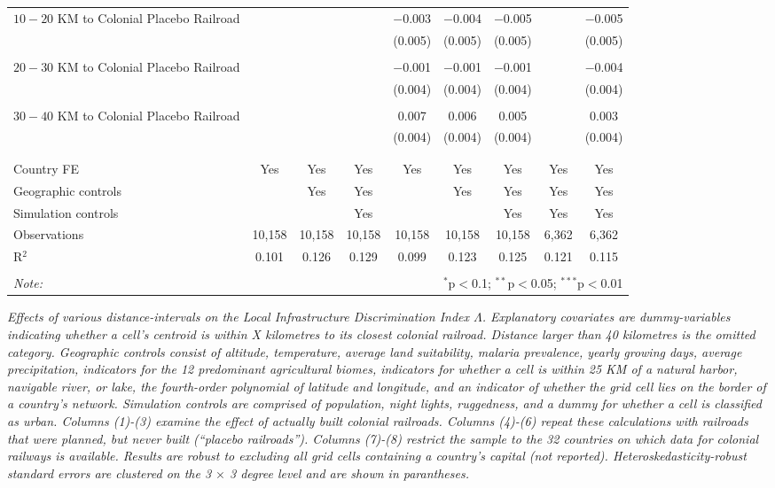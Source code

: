 \documentclass[11pt, oneside]{article}   	%
\newcommand{\mysubcaption}[1]{
\justify
\begin{spacing}{0.7}
\textit{\footnotesize #1}
\end{spacing}}
\begin{document}
\begin{table}[t]
{\begin{tabular}{@{\extracolsep{5pt}}lcccccccc}
   $10-20$ KM to Colonial Placebo Railroad &  &  &  & $-$0.003 & $-$0.004 & $-$0.005 &  & $-$0.005 \\
  &  &  &  & (0.005) & (0.005) & (0.005) &  & (0.005) \\
    & & & & & & & & \\
   $20-30$ KM to Colonial Placebo Railroad &  &  &  & $-$0.001 & $-$0.001 & $-$0.001 &  & $-$0.004 \\
  &  &  &  & (0.004) & (0.004) & (0.004) &  & (0.004) \\
    & & & & & & & & \\
   $30-40$ KM to Colonial Placebo Railroad &  &  &  & 0.007 & 0.006 & 0.005 &  & 0.003 \\
  &  &  &  & (0.004) & (0.004) & (0.004) &  & (0.004) \\
    & & & & & & & & \\
  \hline \\[-1.8ex]
  Country FE & Yes & Yes & Yes & Yes & Yes & Yes & Yes & Yes \\
  Geographic controls &  & Yes & Yes &  & Yes & Yes & Yes & Yes \\
  Simulation controls &  &  & Yes &  &  & Yes & Yes & Yes \\
  Observations & 10,158 & 10,158 & 10,158 & 10,158 & 10,158 & 10,158 & 6,362 & 6,362 \\
  R$^{2}$ & 0.101 & 0.126 & 0.129 & 0.099 & 0.123 & 0.125 & 0.121 & 0.115 \\
  \hline
  \hline \\[-1.8ex]
  \textit{Note:}  & \multicolumn{8}{r}{$^{*}$p$<$0.1; $^{**}$p$<$0.05; $^{***}$p$<$0.01} \\
  \end{tabular}

}

\mysubcaption{Effects of various distance-intervals on the Local Infrastructure Discrimination Index $\Lambda$. Explanatory covariates are dummy-variables indicating whether a cell's centroid is within X kilometres to its closest colonial railroad. Distance larger than 40 kilometres is the omitted category. Geographic controls consist of altitude, temperature, average land suitability, malaria prevalence, yearly growing days, average precipitation, indicators for the 12 predominant agricultural biomes, indicators for whether a cell is within 25 KM of a natural harbor, navigable river, or lake, the fourth-order polynomial of latitude and longitude, and an indicator of whether the grid cell lies on the border of a country's network. Simulation controls are comprised of population, night lights, ruggedness, and a dummy for whether a cell is classified as urban. Columns (1)-(3) examine the effect of actually built colonial railroads. Columns (4)-(6) repeat these calculations with railroads that were planned, but never built (``placebo railroads''). Columns (7)-(8) restrict the sample to the 32 countries on which data for colonial railways is available. Results are robust to excluding all grid cells containing a country's capital (not reported). Heteroskedasticity-robust standard errors are clustered on the 3 $\times$ 3 degree level and are shown in parantheses.}
\end{table}
\end{document}
